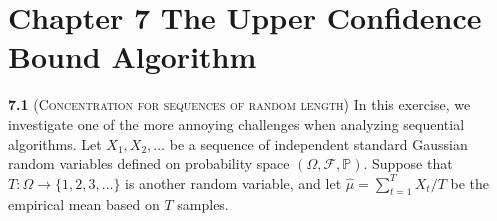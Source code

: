 \chapter*{Chapter 7 The Upper Confidence Bound Algorithm}
\label{sec:7}

\noindent\textbf{7.1} (\textsc{Concentration for sequences of random length})
    In this exercise, we investigate one of the more annoying challenges when analyzing sequential algorithms.
    Let $X_{1}, X_{2}, \ldots$ be a sequence of independent standard Gaussian random variables defined on probability space $(\Omega, \mathcal{F}, \mathbb{P})$.
    Suppose that $T: \Omega \rightarrow\{1,2,3, \ldots\}$ is another random variable, and let $\hat{\mu}=\sum_{t=1}^{T} X_{t} / T$ be the empirical mean based on $T$ samples.







